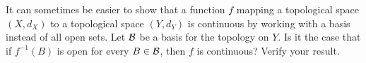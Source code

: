\begin{pa}
\item It can sometimes be easier to show that a function $f$ mapping a topological space $(X,d_X)$ to a topological space $(Y,d_Y)$ is continuous by working with a basis instead of all open sets. Let $\mathcal{B}$ be a basis for the topology on $Y$. Is it the case that if $f^{-1}(B)$ is open for every $B \in \mathcal{B}$, then $f$ is continuous? Verify your result. 

\ee

\end{pa}

\begin{comment}

\ActivitySolution

\be
\item Let 
\[(X, \tau_X) = (\{1,2,3,4\}, \{\emptyset, \{1\}, \{2\}, \{1,2\}, X \}) \text{ and } (Y, \tau_Y) = (\{2,4,6,8\}, \{\emptyset, \{4\}, \{6\}, \{4,6\}, Y\}).\]
Define $f: X \to Y$ by $f(x) = 2x$. 
	\ba
	\item  Any neighborhood of $f(4)=8$ will have to contain an open set that contains $8$. The only open set in $Y$ that contains $8$ $Y$. Now $f^{-1}(Y) = X$ is an open set that contains $4$. So $f^{-1}(N)$ is a neighborhood of $4$ in $X$ whenever $N$ is a neighborhood of $8$ in $Y$. We conclude that $f$ is continuous at $4$.

	\item Note that $\{6\}$ is an open set in $Y$, but $f^{-1}(\{6\}) = \{3\}$ is not an open set in $X$. Therefore, $f$ is not a continuous function. 
	
	\ea

\item 
	\ba
	\item We determine $f^{-1}(O)$ for every open set $O$ in $Y$:
	\begin{itemize}
\item $f^{-1}(\emptyset) = \emptyset$
\item $f^{-1}(\{a\}) = \{1\}$
\item $f^{-1}(\{a,c\}) = \{1,2\}$
\item $f^{-1}(Y) = X$.
\end{itemize}
Since $f^{-1}(O)$ is open in $X$ for every open set $O$ in $Y$, then $f$ is a continuous function. 

	\item Notice that $f(\{3,4\}) = \{b\}$, which is not open in $Y$, so $f$ is not an open function.
	
	\ea
	
\item  First note that $f(1)=f(5)=3$, $f(2)=f(4)=2$, and $f(3) = 1$. So the inverse images of the open sets in $X$ are 
\begin{itemize}
\item $f^{-1}(\emptyset) = \emptyset$
\item $f^{-1}(\{1\}) = \{3\}$
\item $f^{-1}(\{3,5\}) = \{1,5\}$
\item $f^{-1}(\{1,3,5\}) = \{1,3,5\}$
\item $f^{-1}(X) = X$
\end{itemize}


\end{comment}

